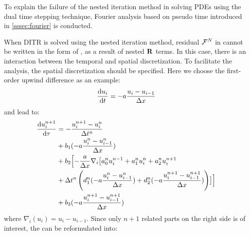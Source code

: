 To explain the failure of the nested iteration method
in solving PDEs using the dual time stepping technique, Fourier
analysis based on pseudo time introduced in \ref{sssec:fourier} is conducted.

When DITR is solved using the nested iteration method,
residual $\mathcal{F}^N$ in 
cannot be written in the form of  ,
as a result of nested $\mathbf{R}$ terms.
In this case, there is an interaction
between the temporal and spatial discretization.
To facilitate the analysis, the spatial discretization
should be specified.
Here we choose the first-order
upwind difference as an example:
\begin{equation}
    \derivative{u_i}{t} = -a \frac{u_i - u_{i-1}}{\inc x}
    \label{eq:fdup1}
\end{equation}
 and  lead to:
\begin{equation}
    \begin{aligned}
        \frac{\dd u_i^{n+1}}{\dd \tau} & =
        -\frac{u_i^{n+1} - u_i^{n}}{{\Delta} t^n}      \\
                                       & +
        b_1 (-a\frac{u_i^{n}-u_{i-1}^{n}}{{\Delta} x}) \\
                                       & +
        b_2 \Bigl[-\frac{a}{{\Delta} x} \nabla_i
        \bigl[
        a^n_0u^{n - 1}_i +
        a^n_1u^{n}_i +
        a^n_2u^{n + 1}_i                           \\
                                       & +
        {\Delta} t^n
        \left(
        d^n_1(-a\frac{u_i^{n}-u_{i-1}^{n}}{{\Delta} x}) +
        d^n_2(-a\frac{u_i^{n+1}-u_{i-1}^{n+1}}{{\Delta} x})
        \right)\bigr]  \Bigr]                      \\
                                       & +
        b_3 (-a\frac{u_i^{n+1}-u_{i-1}^{n+1}}{{\Delta} x})
        \label{eq:nestedDITR_F1}
    \end{aligned}
\end{equation}
where $\nabla_i(u_i) = u_i - u_{i-1}$.
Since only $n+1$ related parts on
the right side is of interest,
the  can be reformulated into:
